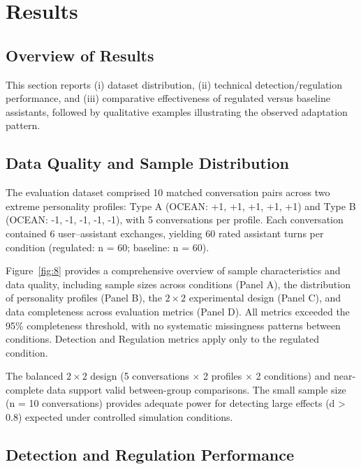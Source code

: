 \section{Results}\label{results}

\subsection{Overview of Results}\label{overview-of-results}

This section reports (i) dataset distribution, (ii) technical detection/regulation performance, and (iii) comparative effectiveness of regulated versus baseline assistants, followed by qualitative examples illustrating the observed adaptation pattern.

\subsection{Data Quality and Sample Distribution}\label{data-quality-and-sample-distribution}

The evaluation dataset comprised 10 matched conversation pairs across two extreme personality profiles: Type A (OCEAN: +1, +1, +1, +1, +1) and Type B (OCEAN: -1, -1, -1, -1, -1), with 5 conversations per profile. Each conversation contained 6 user--assistant exchanges, yielding 60 rated assistant turns per condition (regulated: n = 60; baseline: n = 60).

Figure~\ref{fig:8} provides a comprehensive overview of sample characteristics and data quality, including sample sizes across conditions (Panel A), the distribution of personality profiles (Panel B), the $2 \times 2$ experimental design (Panel C), and data completeness across evaluation metrics (Panel D). All metrics exceeded the 95\% completeness threshold, with no systematic missingness patterns between conditions. Detection and Regulation metrics apply only to the regulated condition.



The balanced $2 \times 2$ design (5 conversations $\times$ 2 profiles $\times$ 2 conditions) and near-complete data support valid between-group comparisons. The small sample size (n = 10 conversations) provides adequate power for detecting large effects (d \textgreater{} 0.8) expected under controlled simulation conditions.

\subsection{Detection and Regulation Performance}\label{detection-and-regulation-performance}

